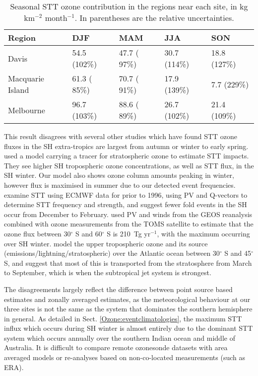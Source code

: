     \begin{table}[t]
      \captionsetup{justification=centering}
      \caption{Seasonal STT ozone contribution in the regions near each site, in kg km$^{-2}$ month$^{-1}$. In parentheses are the relative uncertainties.}
      \begin{tabular}{ l l l l l } 
        \hline
        Region & DJF & MAM & JJA & SON \\
        \hline
        Davis        &  54.5 (102\%) & 47.7 ( 97\%) & 30.7 (114\%) & 18.8 (127\%)\\ 
        Macquarie Island   & 61.3 ( 85\%) & 70.7 ( 91\%) & 17.9 (139\%) &  7.7 (229\%) \\
        Melbourne   & 96.7 (103\%) & 88.6 ( 89\%) & 26.7 (102\%) & 21.4 (109\%) \\
        \hline
      \end{tabular}
      \label{Ozone:fig:extrapolationResults}
    \end{table}
    
    This result disagrees with several other studies which have found STT ozone fluxes in the SH extra-tropics are largest from autumn or winter to early spring.
    \cite{Roelofs1997} used a model carrying a tracer for stratospheric ozone to estimate STT impacts. 
    They see higher SH tropospheric ozone concentrations, as well as STT flux, in the SH winter.
    Our model also shows ozone column amounts peaking in winter, however flux is maximised in summer due to our detected event frequencies.
    \cite{Elbern1998} examine STT using ECMWF data for prior to 1996, using PV and Q-vectors to determine STT frequency and strength, and suggest fewer fold events in the SH occur from December to February.
    \textcite{Olsen2003} used PV and winds from the GEOS reanalysis combined with ozone measurements from the TOMS satellite to estimate that the ozone flux between 30$^{\circ}$ S and 60$^{\circ}$ S is 210~Tg yr$^{-1}$, with the maximum occurring over SH winter.
    \textcite{Liu2017} model the upper tropospheric ozone and its source (emissions/lightning/stratospheric) over the Atlantic ocean between 30$^{\circ}$ S and 45$^{\circ}$ S, and suggest that most of this is transported from the stratosphere from March to September, which is when the subtropical jet system is strongest.
    
    The disagreements largely reflect the difference between point source based estimates and zonally averaged estimates, as the meteorological behaviour at our three sites is not the same as the system that dominates the southern hemisphere in general.
    As detailed in Sect. \ref{Ozone:eventclimatologies}, the maximum STT influx which occurs during SH winter is almost entirely due to the dominant STT system which occurs annually over the southern Indian ocean and middle of Australia.
    It is difficult to compare remote ozonesonde datasets with area averaged models or re-analyses based on non-co-located measurements (such as ERA).

